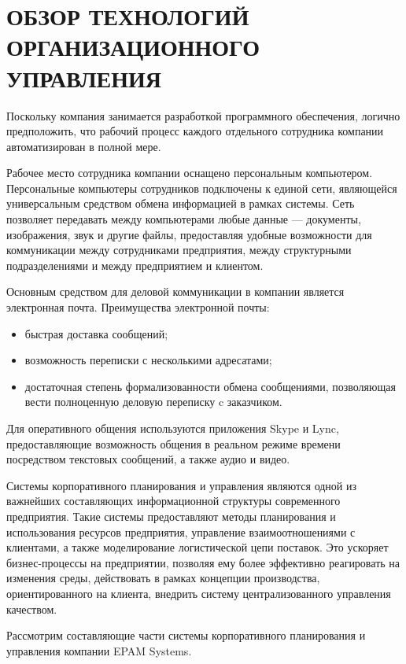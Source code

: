 \section[Обзор технологий организационного управления]{%
  ОБЗОР ТЕХНОЛОГИЙ ОРГАНИЗАЦИОННОГО \\
  УПРАВЛЕНИЯ
}
\label{sec:org_management}

Поскольку компания занимается разработкой программного обеспечения,
логично предположить, что рабочий процесс каждого отдельного сотрудника компании
автоматизирован в полной мере.

Рабочее место сотрудника компании оснащено персональным компьютером. 
Персональные компьютеры сотрудников подключены к единой сети, являющейся
универсальным средством обмена информацией в рамках системы.
Сеть позволяет передавать между компьютерами любые данные --- 
документы, изображения, звук и другие файлы, предоставляя удобные возможности
для коммуникации между сотрудниками предприятия, между структурными подразделениями 
и между предприятием и клиентом. 

Основным средством для деловой коммуникации в компании является электронная почта.
Преимущества электронной почты:
\begin{itemize}
\item быстрая доставка сообщений; 
\item возможность переписки с несколькими адресатами;
\item достаточная степень формализованности обмена сообщениями,
  позволяющая вести полноценную деловую переписку c заказчиком.
\end{itemize}

Для оперативного общения используются приложения Skype и Lync,
предоставляющие возможность общения в реальном режиме времени 
посредством текстовых сообщений, а также аудио и видео.

Системы корпоративного планирования и управления являются одной из
важнейших составляющих информационной структуры современного предприятия.
Такие системы предоставляют методы планирования и использования ресурсов предприятия, 
управление взаимоотношениями с клиентами, а также моделирование логистической цепи поставок.
Это ускоряет бизнес-процессы на предприятии, позволяя ему более эффективно реагировать на
изменения среды, действовать в рамках концепции производства, ориентированного на клиента,
внедрить систему централизованного управления качеством.

Рассмотрим составляющие части системы корпоративного планирования и управления 
компании EPAM Systems.

